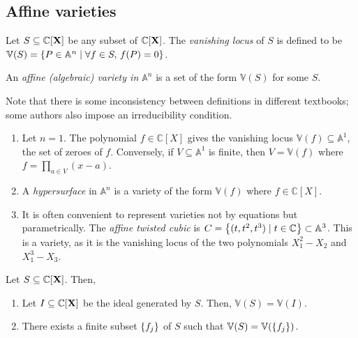 \subsection{Affine varieties}
\begin{definition}
    Let \( S \subseteq \mathbb C[\vb X] \) be any subset of \( \mathbb C[\vb X] \).
    The \emph{vanishing locus} of \( S \) is defined to be \( \mathbb V(S) = \qty{P \in \mathbb A^n \mid \forall f \in S,\, f(P) = 0} \).
\end{definition}
\begin{definition}
    An \emph{affine (algebraic) variety in \( \mathbb A^n \)} is a set of the form \( \mathbb V(S) \) for some \( S \).
\end{definition}
Note that there is some inconsistency between definitions in different textbooks; some authors also impose an irreducibility condition.
\begin{example}
    \begin{enumerate}
        \item Let \( n = 1 \).
        The polynomial \( f \in \mathbb C[X] \) gives the vanishing locus \( \mathbb V(f) \subseteq \mathbb A^1 \), the set of zeroes of \( f \).
        Conversely, if \( V \subseteq \mathbb A^1 \) is finite, then \( V = \mathbb V(f) \) where \( f = \prod_{a \in V} (x - a) \).
        \item A \emph{hypersurface} in \( \mathbb A^n \) is a variety of the form \( \mathbb V(f) \) where \( f \in \mathbb C[X] \).
        \item It is often convenient to represent varieties not by equations but parametrically.
        The \emph{affine twisted cubic} is \( C = \qty{(t, t^2, t^3) \mid t \in \mathbb C} \subset \mathbb A^3 \).
        This is a variety, as it is the vanishing locus of the two polynomials \( X_1^2 - X_2 \) and \( X_1^3 - X_3 \).
    \end{enumerate}
\end{example}
\begin{theorem}
    Let \( S \subseteq \mathbb C[\vb X] \).
    Then,
    \begin{enumerate}
        \item Let \( I \subseteq \mathbb C[\vb X] \) be the ideal generated by \( S \).
        Then, \( \mathbb V(S) = \mathbb V(I) \).
        \item There exists a finite subset \( \qty{f_j} \) of \( S \) such that \( \mathbb V(S) = \mathbb V(\qty{f_j}) \).
    \end{enumerate}
\end{theorem}
